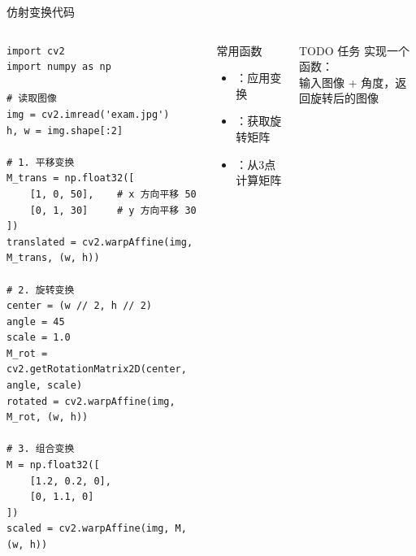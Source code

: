 \begin{frame}[fragile]{仿射变换代码}
    \begin{columns}
        \begin{lstlisting}[basicstyle=\ttfamily\scriptsize]
import cv2
import numpy as np

# 读取图像
img = cv2.imread('exam.jpg')
h, w = img.shape[:2]

# 1. 平移变换
M_trans = np.float32([
    [1, 0, 50],    # x 方向平移 50
    [0, 1, 30]     # y 方向平移 30
])
translated = cv2.warpAffine(img, M_trans, (w, h))

# 2. 旋转变换
center = (w // 2, h // 2)
angle = 45
scale = 1.0
M_rot = cv2.getRotationMatrix2D(center, angle, scale)
rotated = cv2.warpAffine(img, M_rot, (w, h))

# 3. 组合变换
M = np.float32([
    [1.2, 0.2, 0],
    [0, 1.1, 0]
])
scaled = cv2.warpAffine(img, M, (w, h))
        \end{lstlisting}

        \begin{block}{常用函数}
            \begin{itemize}
                \item {}：应用变换
                \item {}：获取旋转矩阵
                \item {}：从3点计算矩阵
            \end{itemize}
        \end{block}

        \begin{alertblock}{TODO 任务}
            实现一个函数：\\
            输入图像 + 角度，返回旋转后的图像
        \end{alertblock}
    \end{columns}
\end{frame}

